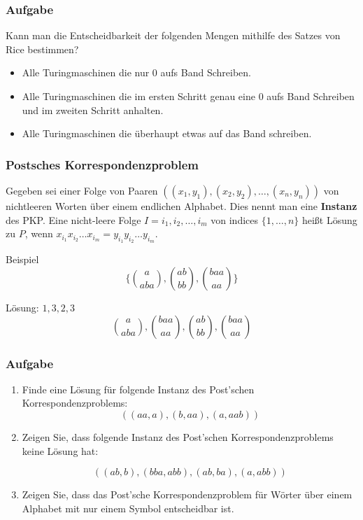 \documentclass{beamer}
\begin{document}
\begin{frame}
\frametitle{Aufgabe}
Kann man die Entscheidbarkeit der folgenden Mengen mithilfe des Satzes von Rice bestimmen?
\begin{itemize}
\item Alle Turingmaschinen die nur $0$ aufs Band Schreiben.
\item Alle Turingmaschinen die im ersten Schritt genau eine $0$ aufs Band Schreiben und im zweiten Schritt anhalten. 
\item Alle Turingmaschinen die überhaupt etwas auf das Band schreiben.
\end{itemize}
\end{frame}
\begin{frame}
\frametitle{Postsches Korrespondenzproblem}
Gegeben sei einer Folge von Paaren $((x_1, y_1), (x_2, y_2), \ldots, (x_n,y_n))$ von nichtleeren Worten über einem endlichen Alphabet. Dies nennt man eine \textbf{Instanz} des PKP.
Eine nicht-leere Folge $I = i_1, i_2, \ldots, i_m$ von indices $\{1, \ldots, n\}$ heißt Lösung zu $P$, wenn $x_{i_1}x_{i_2}\ldots{}x_{i_m} = y_{i_1}y_{i_2}\ldots{}y_{i_m}$.
\begin{block}{Beispiel}
\begin{displaymath}
\{ {a \choose aba}, {ab \choose bb}, {baa \choose aa} \}
\end{displaymath}

Lösung: $1,3,2,3$
\begin{displaymath}
{a \choose aba}, {baa \choose aa}, {ab \choose bb}, {baa \choose aa}
\end{displaymath}

\end{block}
\end{frame}

\begin{frame}
\frametitle{Aufgabe}
\begin{enumerate}
\item Finde eine Lösung für folgende Instanz des Post'schen Korrespondenzproblems: 
\[ ((aa, a), (b, aa), (a, aab)) \]
  \item Zeigen Sie, dass folgende Instanz des Post'schen Korrespondenzproblems
        keine Lösung hat:

        \[ ((ab, b), (bba, abb), (ab, ba), (a, abb)) \]

  \item Zeigen Sie, dass das Post'sche Korrespondenzproblem für Wörter
über einem Alphabet mit nur einem Symbol entscheidbar ist.
\end{enumerate}
\end{frame}
\end{document}
